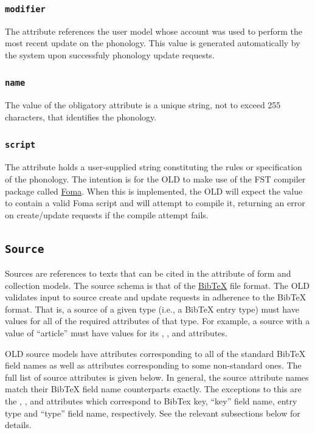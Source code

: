 \documentclass[letterpaper,10pt,english]{sphinxmanual}
\begin{document}
\subsubsection{\texttt{modifier}}
\label{datastructure:modifier}
The  attribute references the user model whose account was used to
perform the most recent update on the phonology.  This value is generated
automatically by the system upon successfuly phonology update requests.


\subsubsection{\texttt{name}}
\label{datastructure:id39}
The value of the obligatory  attribute is a unique string, not to exceed
255 characters, that identifies the phonology.


\subsubsection{\texttt{script}}
\label{datastructure:script}
The  attribute holds a user-supplied string constituting the rules or
specification of the phonology.  The intention is for the OLD to make use of the
FST compiler package called \href{http://code.google.com/p/foma/}{Foma}.  When this
is implemented, the OLD will expect the  value to contain a valid Foma
script and will attempt to compile it, returning an error on create/update
requests if the compile attempt fails.


\subsection{\texttt{Source}}
\label{datastructure:source-data-structure}\label{datastructure:id40}
Sources are references to texts that can be cited in the  attribute of
form and collection models.  The source schema is that of the
\href{http://www.bibtex.org/Format/}{BibTeX} file format.  The OLD validates input
to source create and update requests in adherence to the BibTeX format.
That is, a source of a given type (i.e., a BibTeX entry type) must have values
for all of the required attributes of that type.  For example, a source with a
 value of ``article'' must have values for its , ,
 and  attributes.

OLD source models have attributes corresponding to all of the standard BibTeX
field names as well as attributes corresponding to some non-standard ones.  The
full list of source attributes is given below.  In general, the source attribute
names match their BibTeX field name counterparts exactly.  The exceptions to
this are the , ,  and  attributes which
correspond to BibTex key, ``key'' field name, entry type and ``type'' field name,
respectively.  See the relevant subsections below for details.
\end{document}
